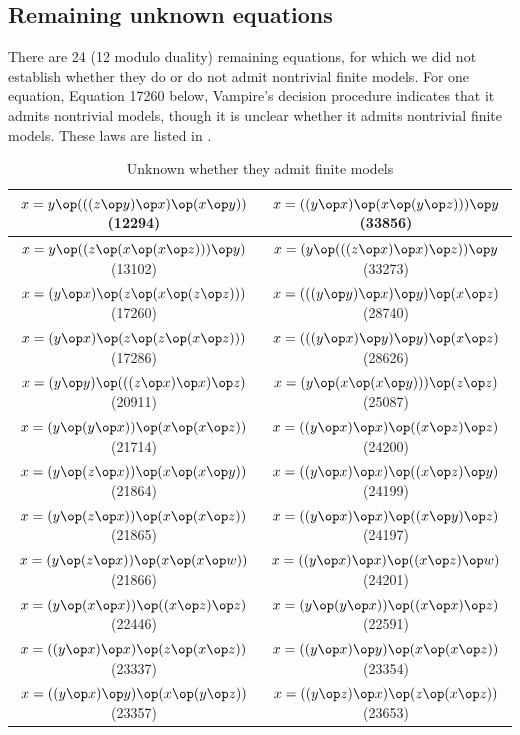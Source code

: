\subsection{Remaining unknown equations}

There are 24 (12 modulo duality) remaining equations, for which we did not establish whether they do or do not admit nontrivial finite models.
For one equation, Equation 17260 below, Vampire's decision procedure indicates that it admits nontrivial models, though it is unclear whether it admits nontrivial finite models.
These laws are listed in .

\begin{table}[h]
\begin{tabular}{|c|c|}
\hline
$x = y \op (((z \op y) \op x) \op (x \op y))$ (12294) & $x = ((y \op x) \op (x \op (y \op z))) \op y$ (33856) \\ \hline
$x = y \op ((z \op (x \op (x \op z))) \op y)$ (13102) & $x = (y \op (((z \op x) \op x) \op z)) \op y$ (33273) \\ \hline
$x = (y \op x) \op (z \op (x \op (z \op z)))$ (17260) & $x = (((y \op y) \op x) \op y) \op (x \op z)$ (28740) \\ \hline
$x = (y \op x) \op (z \op (z \op (x \op z)))$ (17286) & $x = (((y \op x) \op y) \op y) \op (x \op z)$ (28626) \\ \hline
$x = (y \op y) \op (((z \op x) \op x) \op z)$ (20911) & $x = (y \op (x \op (x \op y))) \op (z \op z)$ (25087) \\ \hline
$x = (y \op (y \op x)) \op (x \op (x \op z))$ (21714) & $x = ((y \op x) \op x) \op ((x \op z) \op z)$ (24200) \\ \hline
$x = (y \op (z \op x)) \op (x \op (x \op y))$ (21864) & $x = ((y \op x) \op x) \op ((x \op z) \op y)$ (24199) \\ \hline
$x = (y \op (z \op x)) \op (x \op (x \op z))$ (21865) & $x = ((y \op x) \op x) \op ((x \op y) \op z)$ (24197) \\ \hline
$x = (y \op (z \op x)) \op (x \op (x \op w))$ (21866) & $x = ((y \op x) \op x) \op ((x \op z) \op w)$ (24201) \\ \hline
$x = (y \op (x \op x)) \op ((x \op z) \op z)$ (22446) & $x = (y \op (y \op x)) \op ((x \op x) \op z)$ (22591) \\ \hline
$x = ((y \op x) \op x) \op (z \op (x \op z))$ (23337) & $x = ((y \op x) \op y) \op (x \op (x \op z))$ (23354) \\ \hline
$x = ((y \op x) \op y) \op (x \op (y \op z))$ (23357) & $x = ((y \op z) \op x) \op (z \op (x \op z))$ (23653) \\ \hline
\end{tabular}
\caption{Unknown whether they admit finite models}
\label{table3}
\end{table}


